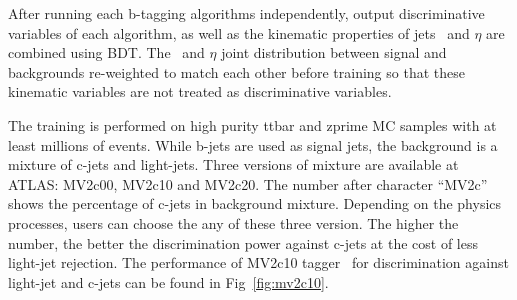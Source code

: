 \par After running each b-tagging algorithms independently, output discriminative variables of each algorithm, as well as the kinematic properties of jets \pt~and $\eta$ are combined using BDT. The \pt~and $\eta$ joint distribution between signal and backgrounds re-weighted to match each other before training so that these kinematic variables are not treated as discriminative variables.
\par The training is performed on high purity ttbar and zprime MC samples with at least millions of events. While b-jets are used as signal jets, 
the background is a mixture of c-jets and light-jets. Three versions of mixture are available at ATLAS: MV2c00, MV2c10 and MV2c20. The number after character ``MV2c''
shows the percentage of c-jets in background mixture. 
Depending on the physics processes, users can choose the any of these three version.
The higher the number, the better the discrimination power against c-jets at the cost of less light-jet rejection. 
The performance of MV2c10 tagger~\cite{Varni:2655785} for discrimination against light-jet and c-jets can be found in Fig~\ref{fig:mv2c10}.

